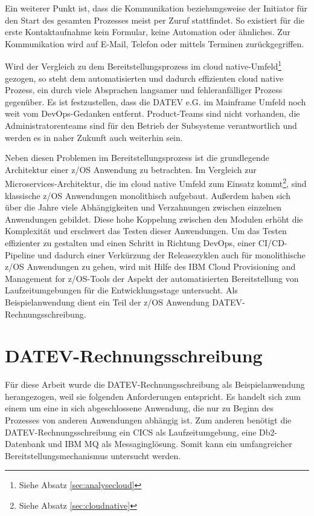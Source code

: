 Ein weiterer Punkt ist, dass die Kommunikation beziehungsweise der Initiator für den Start des gesamten Prozesses meist per Zuruf stattfindet.
So existiert für die erste Kontaktaufnahme kein Formular, keine Automation oder ähnliches.
Zur Kommunikation wird auf E-Mail, Telefon oder mittels Terminen zurückgegriffen.

Wird der Vergleich zu dem Bereitstellungsprozess im cloud native-Umfeld\footnote{Siehe Absatz \ref{sec:analysecloud}} gezogen, so steht dem automatisierten und dadurch effizienten cloud native Prozess, ein durch viele Absprachen langsamer und fehleranfälliger Prozess gegenüber.
Es ist festzustellen, dass die DATEV e.G. im Mainframe Umfeld noch weit vom DevOps-Gedanken entfernt.
Product-Teams sind nicht vorhanden, die Administratorenteams sind für den Betrieb der Subsysteme verantwortlich und werden es in naher Zukunft auch weiterhin sein.

Neben diesen Problemen im Bereitstellungsprozess ist die grundlegende Architektur einer z/OS Anwendung zu betrachten.
Im Vergleich zur \glqq Microservices\grqq-Architektur, die im cloud native Umfeld zum Einsatz kommt\footnote{Siehe Absatz \ref{sec:cloudnative}}, sind klassische z/OS Anwendungen monolithisch aufgebaut.
Außerdem haben sich über die Jahre viele Abhängigkeiten und Verzahnungen zwischen einzelnen Anwendungen gebildet.
Diese hohe Koppelung zwischen den Modulen erhöht die Komplexität und erschwert das Testen dieser Anwendungen.
Um das Testen effizienter zu gestalten und einen Schritt in Richtung DevOps, einer CI/CD-Pipeline und dadurch einer Verkürzung der Releasezyklen auch für monolithische z/OS Anwendungen zu gehen, wird mit Hilfe des \glqq IBM Cloud Provisioning and Management for z/OS\grqq-Tools der Aspekt der automatisierten Bereitstellung von Laufzeitumgebungen für die Entwicklungsstage untersucht.
Als Beispielanwendung dient ein Teil der z/OS Anwendung \glqq DATEV-Rechnungsschreibung\grqq.

\section{DATEV-Rechnungsschreibung}\label{rechBesch}
Für diese Arbeit wurde die DATEV-Rechnungsschreibung als Beispielanwendung herangezogen, weil sie folgenden Anforderungen entspricht.
Es handelt sich zum einem um eine in sich abgeschlossene Anwendung, die nur zu Beginn des Prozesses von anderen Anwendungen abhängig ist.
Zum anderen benötigt die DATEV-Rechnungsschreibung ein CICS als Laufzeitumgebung, eine Db2-Datenbank und IBM MQ als Messaginglösung.
Somit kann ein umfangreicher Bereitstellungsmechanismus untersucht werden.

